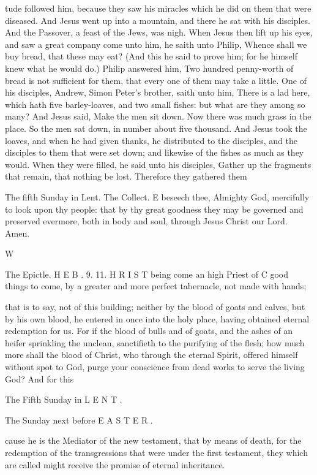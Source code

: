 tude followed him, because they saw his miracles which he did on them that were diseased. And Jesus went up into a mountain, and there he sat with his disciples. And the Passover, a feast of the Jews, was nigh. When Jesus then lift up his eyes, and saw a great company come unto him, he saith unto Philip, Whence shall we buy bread, that these may eat? (And this he said to prove him; for he himself knew what he would do.) Philip answered him, Two hundred penny-worth of bread is not sufficient for them, that every one of them may take a little. One of his disciples, Andrew, Simon Peter’s brother, saith unto him, There is a lad here, which hath five barley-loaves, and two small fishes: but what are they among so many? And Jesus said, Make the men sit down. Now there was much grass in the place. So the men sat down, in number about five thousand. And Jesus took the loaves, and when he had given thanks, he distributed to the disciples, and the disciples to them that were set down; and likewise of the fishes as much as they would. When they were filled, he said unto his disciples, Gather up the fragments that remain, that nothing be lost. Therefore they gathered them

The fifth Sunday in Lent. The Collect. E beseech thee, Almighty God, mercifully to look upon thy people: that by thy great goodness they may be governed and preserved evermore, both in body and soul, through Jesus Christ our Lord. Amen.

W

The Epictle. H E B . 9. 11. H R I S T being come an high Priest of C good things to come, by a greater and more perfect tabernacle, not made with hands;

that is to say, not of this building; neither by the blood of goats and calves, but by his own blood, he entered in once into the holy place, having obtained eternal redemption for us. For if the blood of bulls and of goats, and the ashes of an heifer sprinkling the unclean, sanctifieth to the purifying of the flesh; how much more shall the blood of Christ, who through the eternal Spirit, offered himself without spot to God, purge your conscience from dead works to serve the living God? And for this

The Fifth Sunday in L E N T .

The Sunday next before E A S T E R .

cause he is the Mediator of the new testament, that by means of death, for the redemption of the transgressions that were under the first testament, they which are called might receive the promise of eternal inheritance.

